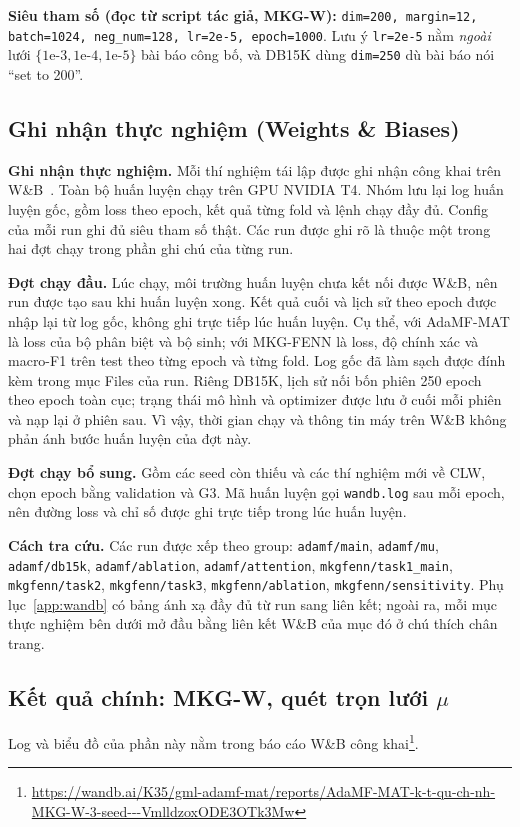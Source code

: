 \documentclass[conference]{IEEEtran}
\renewcommand{\hl}[1]{#1}
\renewcommand{\colorbox}[2]{#2}
\begin{document}
\textbf{Siêu tham số (đọc từ script tác giả, MKG-W):} \texttt{dim=200,
margin=12, batch=1024, neg\_num=128, lr=2e-5, epoch=1000}. Lưu ý \texttt{lr=2e-5}
nằm \emph{ngoài} lưới $\{1\text{e-}3, 1\text{e-}4, 1\text{e-}5\}$ bài báo công bố, và
DB15K dùng \texttt{dim=250} dù bài báo nói ``set to 200''.

\subsection{Ghi nhận thực nghiệm (Weights \& Biases)}
\textbf{\hl{Ghi nhận thực nghiệm.}} \hl{Mỗi thí nghiệm tái lập được ghi nhận công khai trên W\&B}\colorbox{yellow}{~\cite{wandb}}\hl{.
Toàn bộ huấn luyện chạy trên GPU NVIDIA T4. Nhóm lưu lại log huấn luyện gốc, gồm loss theo epoch, kết quả từng fold
và lệnh chạy đầy đủ. Config của mỗi run ghi đủ siêu tham số thật. Các run được ghi rõ là thuộc một trong hai đợt
chạy trong phần ghi chú của từng run.}

\textbf{\hl{Đợt chạy đầu.}} \hl{Lúc chạy, môi trường huấn luyện chưa kết nối được W\&B, nên run được tạo sau khi huấn
luyện xong. Kết quả cuối và lịch sử theo epoch được nhập lại từ log gốc, không ghi trực tiếp lúc huấn luyện. Cụ thể,
với AdaMF-MAT là loss của bộ phân biệt và bộ sinh; với MKG-FENN là loss, độ chính xác và macro-F1 trên test theo từng
epoch và từng fold. Log gốc đã làm sạch được đính kèm trong mục Files của run. Riêng DB15K, lịch sử nối bốn phiên
250 epoch theo epoch toàn cục; trạng thái mô hình và optimizer được lưu ở cuối mỗi phiên và nạp lại ở phiên sau.
Vì vậy, thời gian chạy và thông tin máy trên W\&B không phản ánh bước huấn luyện của đợt này.}

\textbf{\hl{Đợt chạy bổ sung.}} \hl{Gồm các seed còn thiếu và các thí nghiệm mới về CLW, chọn epoch bằng validation và G3.
Mã huấn luyện gọi} \colorbox{yellow}{\texttt{wandb.log}} \hl{sau mỗi epoch, nên đường loss và chỉ số được ghi trực tiếp
trong lúc huấn luyện.}

\textbf{\hl{Cách tra cứu.}} \hl{Các run được xếp theo group:
\texttt{adamf/main}, \texttt{adamf/mu}, \texttt{adamf/db15k},
\texttt{adamf/ablation}, \texttt{adamf/attention},
\texttt{mkgfenn/task1\_main}, \texttt{mkgfenn/task2},
\texttt{mkgfenn/task3}, \texttt{mkgfenn/ablation},
\texttt{mkgfenn/sensitivity}. Phụ lục}\colorbox{yellow}{~\ref{app:wandb}}\hl{ có bảng ánh xạ đầy đủ từ run sang
liên kết; ngoài ra, mỗi mục thực nghiệm bên dưới mở đầu bằng liên kết W\&B của mục đó ở chú thích chân trang.}

\subsection{Kết quả chính: MKG-W, quét trọn lưới $\mu$}
\noindent Log và biểu đồ của phần này nằm trong báo cáo W\&B công khai\footnote{\url{https://wandb.ai/K35/gml-adamf-mat/reports/AdaMF-MAT-k-t-qu-ch-nh-MKG-W-3-seed---VmlldzoxODE3OTk3Mw}}.
\end{document}
